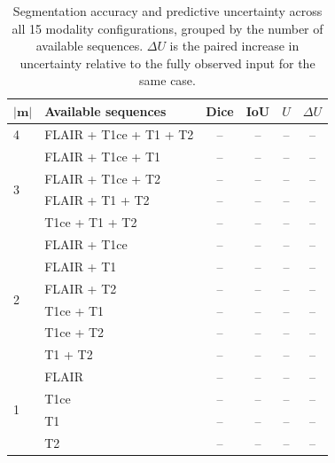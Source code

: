 \begin{table}[t]
    \centering
    \caption{Segmentation accuracy and predictive uncertainty across all 15
    modality configurations, grouped by the number of available sequences.
    $\Delta U$ is the paired increase in uncertainty relative to the fully
    observed input for the same case.}
    \label{tab:modality}
    \begin{tabular}{llcccc}
        \toprule
        $|\mathbf{m}|$ & Available sequences & Dice & IoU & $U$ & $\Delta U$ \\
        \midrule
        4 & FLAIR + T1ce + T1 + T2 & -- & -- & -- & --   \\
        \midrule
        \multirow{4}{*}{3}
          & FLAIR + T1ce + T1      & -- & -- & -- & -- \\
          & FLAIR + T1ce + T2      & -- & -- & -- & -- \\
          & FLAIR + T1 + T2        & -- & -- & -- & -- \\
          & T1ce + T1 + T2         & -- & -- & -- & -- \\
        \midrule
        \multirow{6}{*}{2}
          & FLAIR + T1ce           & -- & -- & -- & -- \\
          & FLAIR + T1             & -- & -- & -- & -- \\
          & FLAIR + T2             & -- & -- & -- & -- \\
          & T1ce + T1              & -- & -- & -- & -- \\
          & T1ce + T2              & -- & -- & -- & -- \\
          & T1 + T2                & -- & -- & -- & -- \\
        \midrule
        \multirow{4}{*}{1}
          & FLAIR                  & -- & -- & -- & -- \\
          & T1ce                   & -- & -- & -- & -- \\
          & T1                     & -- & -- & -- & -- \\
          & T2                     & -- & -- & -- & -- \\
        \bottomrule
    \end{tabular}
\end{table}


